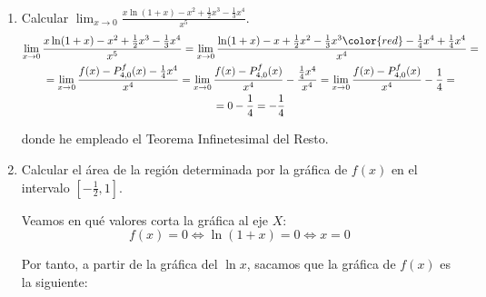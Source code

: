 \documentclass[12pt]{article}
\begin{document}
\begin{ejercicio}
\begin{enumerate}
    \item Calcular $\displaystyle \lim_{x\to 0}\frac{x\ln (1+x)-x^2+\frac{1}{2}x^3-\frac{1}{3}x^4}{x^5}$.
    \begin{multline*}
        \lim_{x\to 0}\frac{x\ln (1+x)-x^2+\frac{1}{2}x^3-\frac{1}{3}x^4}{x^5}
        = \lim_{x\to 0}\frac{\ln (1+x)-x+\frac{1}{2}x^2-\frac{1}{3}x^3 {\color{red} -\frac{1}{4}x^4 +\frac{1}{4}x^4}}{x^4}
        =\\= \lim_{x\to 0}\frac{f(x)-P_{4,0}^f(x) -\frac{1}{4}x^4}{x^4}
        = \lim_{x\to 0}\frac{f(x)-P_{4,0}^f(x)}{x^4}
        - \frac{\frac{1}{4}x^4}{x^4}
        = \lim_{x\to 0}\frac{f(x)-P_{4,0}^f(x)}{x^4}
        - \frac{1}{4}
        =\\= 0- \frac{1}{4}=- \frac{1}{4}
    \end{multline*}

    donde he empleado el Teorema Infinetesimal del Resto.

    \item Calcular el área de la región determinada por la gráfica de $f(x)$ en el intervalo $\left[-\frac{1}{2},1\right]$.

    Veamos en qué valores corta la gráfica al eje $X$:
    \begin{equation*}
        f(x)=0 \Longleftrightarrow \ln (1+x)=0 \Longleftrightarrow x=0
    \end{equation*}

    Por tanto, a partir de la gráfica del $\ln x$, sacamos que la gráfica de $f(x)$ es la siguiente:
    \begin{figure}[H]
        \centering
        
\end{figure}
\end{enumerate}
\end{ejercicio}
\end{document}
